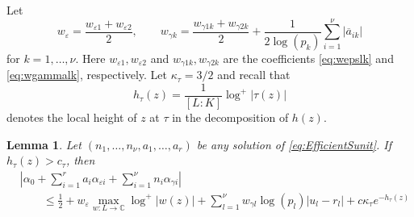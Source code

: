 \documentclass[11pt]{report}
\newtheorem{lemma}[theorem]{Lemma}
\theoremstyle{definition}
\newcommand{\eps}{\varepsilon}
\begin{document}
Let
\begin{equation} \label{eq:wsigma}
w_{\varepsilon} = \frac{w_{\varepsilon 1} + w_{\varepsilon 2}}{2}, \quad \quad w_{\gamma k} = \frac{w_{\gamma 1 k} + w_{\gamma 2 k}}{2} + \frac{1}{2\log(p_k)}\sum_{i=1}^{\nu}|\overline{a}_{ik}|
\end{equation}
for $k = 1, \dots, \nu$. Here $w_{\eps 1}, w_{\eps 2}$ and $w_{\gamma 1 k}, w_{\gamma 2 k}$ are the coefficients \eqref{eq:wepslk} and \eqref{eq:wgammalk}, respectively. Let $\kappa_{\tau} = 3/2$ and recall  that
\[h_{\tau}(z) = \frac{1}{[L:K]}\log^+|\tau(z)|\]
denotes the local height of $z$ at $\tau$ in the decomposition of $h(z)$.

\begin{lemma}\label{lem:archellest}
Let $(n_1, \dots, n_{\nu}, a_1, \dots, a_r)$ be any solution of \eqref{eq:EfficientSunit}. If $h_{\tau}(z) > c_{\tau}$, then
\begin{align*}
& \left|\alpha_0+\sum_{i = 1}^r a_i \alpha_{\varepsilon i} + \sum_{i = 1}^{\nu} n_i \alpha_{\gamma i}\right| \\
	& \quad \quad \leq \frac{1}{2} + w_{\eps} \max_{w :L \to \mathbb{C}}\log^+|w(z)| + \sum_{l = 1}^{\nu}w_{\gamma l} \log(p_l)|u_l - r_l| + c\kappa_{\tau}e^{-h_{\tau}(z)}
\end{align*}
\end{lemma}
\end{document}
